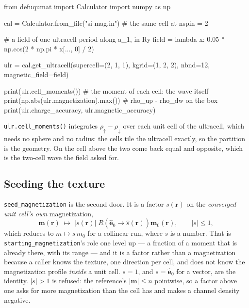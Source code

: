 \documentclass[11pt,a4paper]{article}
\newcommand{\code}[1]{\texttt{\small #1}}
\begin{document}
\begin{pycode}
from defuqumat import Calculator
import numpy as np

cal = Calculator.from_file("si-mag.in")     # the same cell at nspin = 2

# a field of one ultracell period along a_1, in Ry
field = lambda x: 0.05 * np.cos(2 * np.pi * x[..., 0] / 2)

ulr = cal.get_ultracell(supercell=(2, 1, 1), kgrid=(1, 2, 2),
                        nbnd=12, magnetic_field=field)

print(ulr.cell_moments())          # the moment of each cell: the wave itself
print(np.abs(ulr.magnetization).max())         # rho_up - rho_dw on the box
print(ulr.charge_accuracy, ulr.magnetic_accuracy)
\end{pycode}

\code{ulr.cell\_moments()} integrates $\rho_\uparrow - \rho_\downarrow$ over
each unit cell of the ultracell, which needs no sphere and no radius: the cells
tile the ultracell exactly, so the partition is the geometry. On the cell above
the two come back equal and opposite, which is the two-cell wave the field asked
for.

\subsection*{Seeding the texture}

\code{seed\_magnetization} is the second door. It is a factor
$s(\mathbf r)$ on the \emph{converged unit cell's own} magnetization,
\begin{equation*}
  \mathbf m(\mathbf r) \;\longmapsto\;
  |s(\mathbf r)|\; R\!\left(\hat{\mathbf e}_0 \to \hat s(\mathbf r)\right)
  \mathbf m_0(\mathbf r),
  \qquad |s| \le 1,
\end{equation*}
which reduces to $m \mapsto s\,m_0$ for a collinear run, where $s$ is a number.
That is \code{starting\_magnetization}'s role one level up --- a fraction of a
moment that is already there, with its range --- and it is a factor rather than
a magnetization because a caller knows the texture, one direction per cell, and
does not know the magnetization profile \emph{inside} a unit cell. $s = 1$, and
$s = \hat{\mathbf e}_0$ for a vector, are the identity. $|s| > 1$ is refused: the
reference's $|\mathbf m| \le n$ pointwise, so a factor above one asks for more
magnetization than the cell has and makes a channel density negative.
\end{document}
